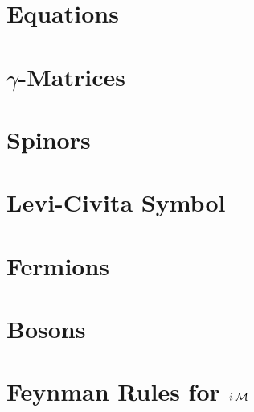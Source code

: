 \documentclass[landscape,8pt,a4paper,english]{extarticle}
\begin{document}
\begin{multicols}{3}\centering
        \section*{Equations}
        \section*{$\gamma$-Matrices}
        \section*{Spinors}
        \section*{Levi-Civita Symbol}
        \section*{Fermions}
        \section*{Bosons}
        \section*{Feynman Rules for $i\operatorname{\mathcal{M}}$}
\end{multicols}
\end{document}
